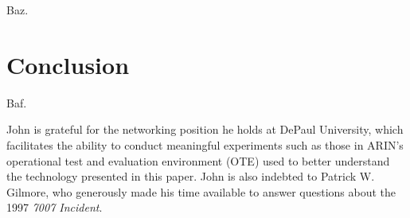\documentclass[sigconf]{acmart}
\begin{document}
Baz.

\section{Conclusion}\label{sec:Conclusion}

Baf.

\begin{acks}

John is grateful for the networking position he holds at DePaul
University, which facilitates the ability to conduct meaningful
experiments such as those in ARIN's operational test and evaluation
environment (OTE) used to better understand the technology presented in
this paper.  John is also indebted to Patrick W.  Gilmore, who
generously made his time available to answer questions about the 1997
\emph{7007 Incident}.

\end{acks}


\end{document}
